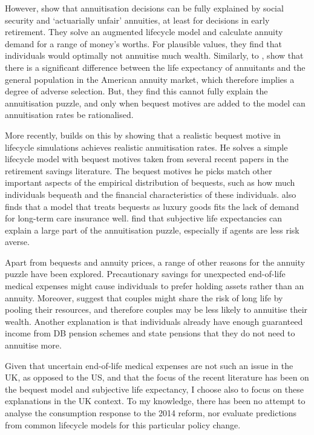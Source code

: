 \documentclass[12pt]{article}
\begin{document}
However, \cite{friedman-warshawsky-qje-1990} show that annuitisation decisions
can be fully explained by social security and `actuarially unfair' annuities, at
least for decisions in early retirement. They solve an augmented lifecycle model
and calculate annuity demand for a range of money's worths. For plausible values,
they find that individuals would optimally not annuitise much wealth. Similarly,
to \cite{finkelstein-porteba-2004}, \cite{friedman-warshawsky-chicago-1988} show
that there is a significant difference between the life expectancy of annuitants
and the general population in the American annuity market, which therefore
implies a degree of adverse selection. But, they find this cannot fully explain
the annuitisation puzzle, and only when bequest motives are added to the model
can annuitisation rates be rationalised.

More recently, \cite{lockwood-red-2012} builds on this by showing that a
realistic bequest motive in lifecycle simulations achieves realistic
annuitisation rates. He solves a simple lifecycle model with bequest motives
taken from several recent papers in the retirement savings literature. The
bequest motives he picks match other important aspects of the empirical
distribution of bequests, such as how much individuals bequeath and the
financial characteristics of these individuals. \cite{lockwood-aer-2018} also
finds that a model that treats bequests as luxury goods fits the lack of demand
for long-term care insurance well. \cite{odea-sturrock-rest-2023} find that
subjective life expectancies can explain a large part of the annuitisation
puzzle, especially if agents are less risk averse.

Apart from bequests and annuity prices, a range of other reasons for the annuity
puzzle have been explored. Precautionary savings for unexpected end-of-life
medical expenses might cause individuals to prefer holding assets rather than
an annuity. Moreover, \cite{vidalmelia-lejarragagarcia-munich-2004} suggest
that couples might share the risk of long life by pooling their resources, and
therefore couples may be less likely to annuitise their wealth. Another
explanation is that individuals already have enough guaranteed income from DB
pension schemes and state pensions that they do not need to annuitise more.

Given that uncertain end-of-life medical expenses are not such an issue in the
UK, as opposed to the US, and that the focus of the recent literature has been
on the bequest model and subjective life expectancy, I choose also to focus on
these explanations in the UK context. To my knowledge, there has been no attempt
to analyse the consumption response to the 2014 reform, nor evaluate predictions
from common lifecycle models for this particular policy change.
\end{document}

